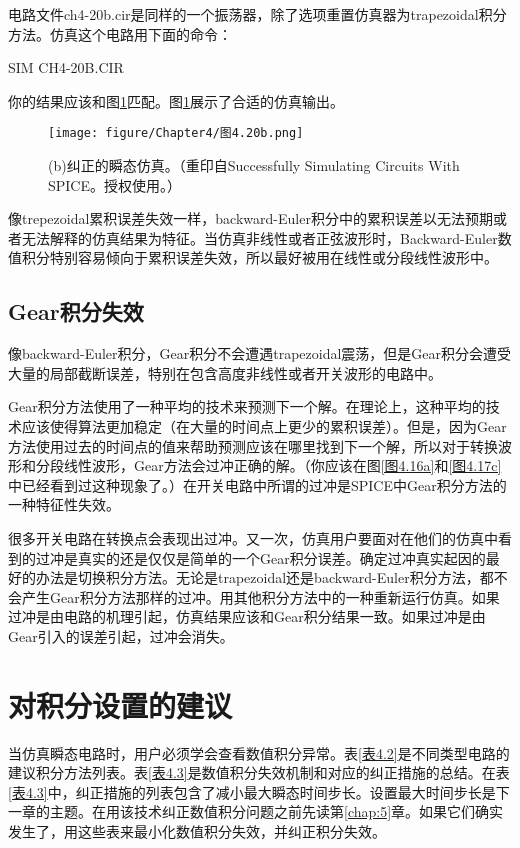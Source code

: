 电路文件ch4-20b.cir是同样的一个振荡器，除了选项重置仿真器为trapezoidal积分方法。仿真这个电路用下面的命令：

SIM CH4-20B.CIR

你的结果应该和图\ref{图4.20b}匹配。图\ref{图4.20b}展示了合适的仿真输出。
\begin{figure}[htbp]
\small
    \centering
    \texttt{[image: figure/Chapter4/图4.20b.png]}
    \caption{(b)纠正的瞬态仿真。（重印自Successfully Simulating Circuits With SPICE。授权使用。）}
    \label{图4.20b}
\end{figure}

像trepezoidal累积误差失效一样，backward-Euler积分中的累积误差以无法预期或者无法解释的仿真结果为特征。当仿真非线性或者正弦波形时，Backward-Euler数值积分特别容易倾向于累积误差失效，所以最好被用在线性或分段线性波形中。

\subsection{Gear积分失效}
像backward-Euler积分，Gear积分不会遭遇trapezoidal震荡，但是Gear积分会遭受大量的局部截断误差，特别在包含高度非线性或者开关波形的电路中。

Gear积分方法使用了一种平均的技术来预测下一个解。在理论上，这种平均的技术应该使得算法更加稳定（在大量的时间点上更少的累积误差）。但是，因为Gear方法使用过去的时间点的值来帮助预测应该在哪里找到下一个解，所以对于转换波形和分段线性波形，Gear方法会过冲正确的解。（你应该在图\ref{图4.16a}和\ref{图4.17c}中已经看到过这种现象了。）在开关电路中所谓的过冲是SPICE中Gear积分方法的一种特征性失效。

很多开关电路在转换点会表现出过冲。又一次，仿真用户要面对在他们的仿真中看到的过冲是真实的还是仅仅是简单的一个Gear积分误差。确定过冲真实起因的最好的办法是切换积分方法。无论是trapezoidal还是backward-Euler积分方法，都不会产生Gear积分方法那样的过冲。用其他积分方法中的一种重新运行仿真。如果过冲是由电路的机理引起，仿真结果应该和Gear积分结果一致。如果过冲是由Gear引入的误差引起，过冲会消失。

\section{对积分设置的建议}
当仿真瞬态电路时，用户必须学会查看数值积分异常。表\ref{表4.2}是不同类型电路的建议积分方法列表。表\ref{表4.3}是数值积分失效机制和对应的纠正措施的总结。在表\ref{表4.3}中，纠正措施的列表包含了减小最大瞬态时间步长。设置最大时间步长是下一章的主题。在用该技术纠正数值积分问题之前先读第\ref{chap:5}章。如果它们确实发生了，用这些表来最小化数值积分失效，并纠正积分失效。

